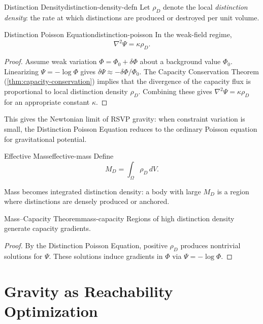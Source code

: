 \documentclass[12pt,twoside,openright]{book}
\begin{document}
\begin{definition}{Distinction Density}{distinction-density-defn}
  Let $\rho_D$ denote the local \emph{distinction density}:
  the rate at which distinctions are produced or destroyed
  per unit volume.
\end{definition}

\begin{theorem}{Distinction Poisson Equation}{distinction-poisson}
  In the weak-field regime,
  \[
    \nabla^2 \Psi = \kappa \rho_D.
  \]
\end{theorem}

\begin{proof}
  Assume weak variation $\Phi = \Phi_0 + \delta\Phi$ about
  a background value $\Phi_0$. Linearizing
  $\Psi = -\log\Phi$ gives $\delta\Psi \approx
  -\delta\Phi/\Phi_0$. The Capacity Conservation Theorem
  (\cref{thm:capacity-conservation}) implies that the
  divergence of the capacity flux is proportional to local
  distinction density $\rho_D$. Combining these gives
  $\nabla^2\Psi = \kappa\rho_D$ for an appropriate constant
  $\kappa$.
\end{proof}

This gives the Newtonian limit of RSVP gravity: when
constraint variation is small, the Distinction Poisson
Equation reduces to the ordinary Poisson equation for
gravitational potential.

\begin{definition}{Effective Mass}{effective-mass}
  Define
  \[
    M_D = \int_\Omega \rho_D \, dV.
  \]
\end{definition}

Mass becomes integrated distinction density: a body with
large $M_D$ is a region where distinctions are densely
produced or anchored.

\begin{theorem}{Mass--Capacity Theorem}{mass-capacity}
  Regions of high distinction density generate capacity
  gradients.
\end{theorem}

\begin{proof}
  By the Distinction Poisson Equation, positive $\rho_D$
  produces nontrivial solutions for $\Psi$. These solutions
  induce gradients in $\Phi$ via $\Psi = -\log\Phi$.
\end{proof}

\section{Gravity as Reachability Optimization}
\label{sec:ch17-optimization}
\end{document}
